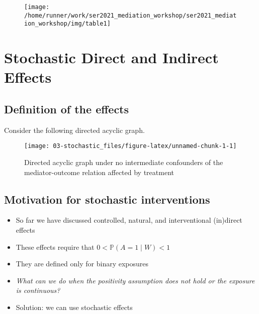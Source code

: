 \documentclass[
  12pt,
]{book}
\providecommand{\tightlist}{%
  \setlength{\itemsep}{0pt}\setlength{\parskip}{0pt}}
\theoremstyle{definition}
\theoremstyle{definition}
\theoremstyle{definition}
\renewcommand{\P}{\mathbb{P}}
\newcommand{\1}{\mathbbm{1}}
\begin{document}
\begin{figure}

{\centering \texttt{[image: /home/runner/work/ser2021\_mediation\_workshop/ser2021\_mediation\_workshop/img/table1]} 

}

\end{figure}

\hypertarget{stochastic}{%
\chapter{Stochastic Direct and Indirect Effects}\label{stochastic}}

\hypertarget{definition-of-the-effects}{%
\section{Definition of the effects}\label{definition-of-the-effects}}

Consider the following directed acyclic graph.

\begin{figure}

{\centering \texttt{[image: 03-stochastic\_files/figure-latex/unnamed-chunk-1-1]} 

}

\caption{Directed acyclic graph under no intermediate confounders of the mediator-outcome relation affected by treatment}\label{fig:unnamed-chunk-1}
\end{figure}

\hypertarget{motivation-for-stochastic-interventions}{%
\section{Motivation for stochastic interventions}\label{motivation-for-stochastic-interventions}}

\begin{itemize}
\tightlist
\item
  So far we have discussed controlled, natural, and interventional (in)direct effects
\item
  These effects require that \(0 < \P(A=1\mid W) < 1\)
\item
  They are defined only for binary exposures
\item
  \emph{What can we do when the positivity assumption does not hold or the exposure
  is continuous?}
\item
  Solution: we can use stochastic effects
\end{itemize}
\end{document}
